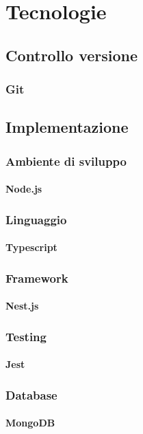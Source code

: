 \chapter{Tecnologie}

\section{Controllo versione}
\subsection{Git}

\section{Implementazione}
\subsection{Ambiente di sviluppo}
\subsubsection{Node.js}
\subsection{Linguaggio}
\subsubsection{Typescript}
\subsection{Framework}
\subsubsection{Nest.js}
\subsection{Testing}
\subsubsection{Jest}
\subsection{Database}
\subsubsection{MongoDB}
